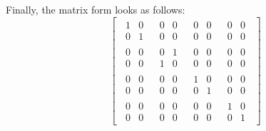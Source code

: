 \documentclass[fleqn]{article}
\begin{document}
Finally, the matrix form looks as follows:
\[
  \left[
  \,
    \begin{array}{c|c|c|c}
      \begin{matrix}1&0\\0&1\end{matrix}
      & \begin{matrix}0&0\\0&0\end{matrix}
      & \begin{matrix}0&0\\0&0\end{matrix}
      & \begin{matrix}0&0\\0&0\end{matrix}
    \\\hline
    \begin{matrix}0&0\\0&0\end{matrix}
      & \begin{matrix}0&1\\1&0\end{matrix}
      & \begin{matrix}0&0\\0&0\end{matrix}
      & \begin{matrix}0&0\\0&0\end{matrix}
    \\\hline
    \begin{matrix}0&0\\0&0\end{matrix}
      & \begin{matrix}0&0\\0&0\end{matrix}
      & \begin{matrix}1&0\\0&1\end{matrix}
      & \begin{matrix}0&0\\0&0\end{matrix}
    \\\hline
    \begin{matrix}0&0\\0&0\end{matrix}
      & \begin{matrix}0&0\\0&0\end{matrix}
      & \begin{matrix}0&0\\0&0\end{matrix}
      & \begin{matrix}1&0\\0&1\end{matrix}
    \end{array}
  \,
  \right]
\]
\end{document}
